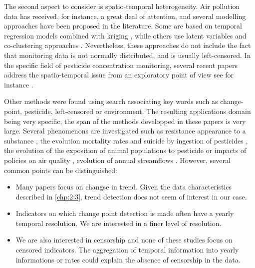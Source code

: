 The second aspect to consider is spatio-temporal heterogeneity. Air pollution data has received, for instance, a great deal of attention, and several modelling approaches have been proposed in the literature. Some are based on temporal regression models combined with kriging \cite{sampson2011,lindstrom2014flexible}, while others use latent variables and co-clustering approaches \cite{bouveyron2021co}. Nevertheless, these approaches do not include the fact that monitoring data is not normally distributed, and is usually left-censored. In the specific field of pesticide concentration monitoring, several recent papers address the spatio-temporal issue from an exploratory point of view see for instance \cite{masia2016,figueiredo2021spatio,aznar2017spatio}. 

Other methods were found using search associating key words such as change-point, pesticide, left-censored or environment. The resulting applications domain being very specific, the span of the methods developped in these papers is very large. Several phenomenons are investigated such as resistance appearance to a substance \cite{Solla2010}, the evolution mortality rates and suicide by ingestion of pesticides \cite{Ko2017}, the evolution of the exposition of animal populations to pesticide \cite{Menger2022} or impacts of policies on air quality \cite{FOMBY2006}, evolution of annual streamflows \cite{Ryberg2020}. However, several common points can be distinguished:      
\begin{itemize}
\item Many papers focus on changse in trend. Given the data characteristics described in \ref{chp:2:3}, trend detection does not seem of interest in our case.
\item Indicators on which change point detection is made often have a yearly temporal resolution. We are interested in a finer level of resolution. 
\item We are also interested in censorship and none of these studies focus on censored indicators. The aggregation of temporal information into yearly informations or rates could explain the absence of censorship in the data.   
\end{itemize}






 

 